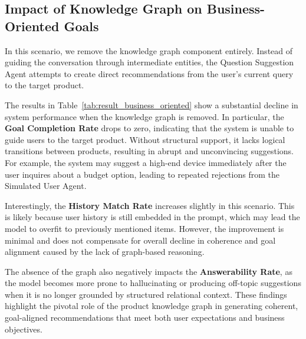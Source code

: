 \subsection{Impact of Knowledge Graph on Business-Oriented Goals}

In this scenario, we remove the knowledge graph component entirely. Instead of guiding the conversation through intermediate entities, the Question Suggestion Agent attempts to create direct recommendations from the user's current query to the target product.

The results in Table~\ref{tab:result_business_oriented} show a substantial decline in system performance when the knowledge graph is removed. In particular, the \textbf{Goal Completion Rate} drops to zero, indicating that the system is unable to guide users to the target product. Without structural support, it lacks logical transitions between products, resulting in abrupt and unconvincing suggestions. For example, the system may suggest a high-end device immediately after the user inquires about a budget option, leading to repeated rejections from the Simulated User Agent.

Interestingly, the \textbf{History Match Rate} increases slightly in this scenario. This is likely because user history is still embedded in the prompt, which may lead the model to overfit to previously mentioned items. However, the improvement is minimal and does not compensate for overall decline in coherence and goal alignment caused by the lack of graph-based reasoning.

The absence of the graph also negatively impacts the \textbf{Answerability Rate}, as the model becomes more prone to hallucinating or producing off-topic suggestions when it is no longer grounded by structured relational context. These findings highlight the pivotal role of the product knowledge graph in generating coherent, goal-aligned recommendations that meet both user expectations and business objectives.




